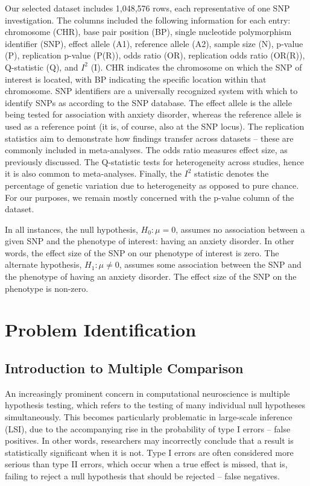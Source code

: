 \documentclass[12pt]{article}
\begin{document}
Our selected dataset includes 1,048,576 rows, each representative of one SNP investigation. The columns included the following information for each entry: chromosome (CHR), base pair position (BP), single nucleotide polymorphism identifier (SNP), effect allele (A1), reference allele (A2), sample size (N), p-value (P), replication p-value (P(R)), odds ratio (OR), replication odds ratio (OR(R)), Q-statistic (Q), and $I^2$ (I). CHR indicates the chromosome on which the SNP of interest is located, with BP indicating the specific location within that chromosome. SNP identifiers are a universally recognized system with which to identify SNPs as according to the SNP database. The effect allele is the allele being tested for association with anxiety disorder, whereas the reference allele is used as a reference point (it is, of course, also at the SNP locus). The replication statistics aim to demonstrate how findings transfer across datasets -- these are commonly included in meta-analyses. The odds ratio measures effect size, as previously discussed. The Q-statistic tests for heterogeneity across studies, hence it is also common to meta-analyses. Finally, the $I^2$ statistic denotes the percentage of genetic variation due to heterogeneity as opposed to pure chance. For our purposes, we remain mostly concerned with the p-value column of the dataset. \par

In all instances, the null hypothesis, $H_0: \mu = 0$, assumes no association between a given SNP and the phenotype of interest: having an anxiety disorder. In other words, the effect size of the SNP on our phenotype of interest is zero. The alternate hypothesis, $H_1: \mu \ne 0$, assumes some association between the SNP and the phenotype of having an anxiety disorder. The effect size of the SNP on the phenotype is non-zero. \par


\newpage

\section{Problem Identification}
\subsection{Introduction to Multiple Comparison}
An increasingly prominent concern in computational neuroscience is multiple hypothesis testing, which refers to the testing of many individual null hypotheses simultaneously. This becomes particularly problematic in large-scale inference (LSI), due to the accompanying rise in the probability of type I errors -- false positives. In other words, researchers may incorrectly conclude that a result is statistically significant when it is not. Type I errors are often considered more serious than type II errors, which occur when a true effect is missed, that is, failing to reject a null hypothesis that should be rejected -- false negatives. \par
\end{document}
